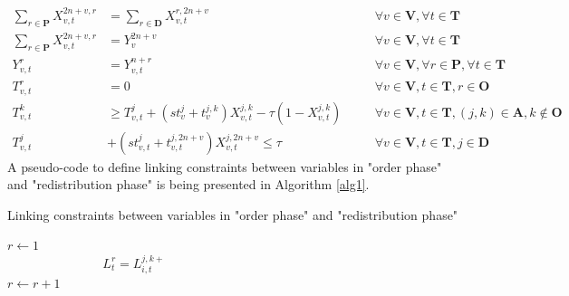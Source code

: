\documentclass[11pt,letter]{article}
\begin{document}
\begin{align}
\sum_{r \in \textbf{P}} X_{v,t}^{2n+v,r} & = \sum_{r \in \textbf{D}} X_{v,t}^{r,2n+v} && \quad \forall v \in \textbf{V}, \forall t \in \textbf{T} \\
\sum_{r \in \textbf{P}} X_{v,t}^{2n+v,r} & = Y_{v}^{2n+v} && \quad \forall v \in \textbf{V}, \forall t \in \textbf{T}\\
Y_{v,t}^{r} & = Y_{v,t}^{n+r} && \quad \forall v \in \textbf{V}, \forall r \in \textbf{P}, \forall t \in \textbf{T} \\
T_{v,t}^{r} & = 0 && \quad \forall v \in \textbf{V}, t \in \textbf{T}, r \in \textbf{O} \\
T_{v,t}^{k} & \geq T_{v,t}^{j}+(st_{v}^{j}+t_{v}^{j,k})X_{v,t}^{j,k}-\tau (1-X_{v,t}^{j,k}) && \quad \forall v \in \textbf{V}, t \in \textbf{T}, (j,k) \in \textbf{A}, k \not \in \textbf{O} \\
T_{v,t}^{j} & +(st_{v,t}^{j}+t_{v,t}^{j,2n+v})X_{v,t}^{j,2n+v} \leq \tau && \quad \forall v \in \textbf{V}, t \in \textbf{T}, j \in \textbf{D} 
\end{align}
A pseudo-code to define linking constraints between variables in "order phase" and "redistribution phase" is being presented in Algorithm \ref{alg1}.

\begin{algorithm}[H]
\caption{Linking constraints between variables in "order phase" and "redistribution phase"}
\label{alg1}
\begin{algorithmic}
\STATE $r \leftarrow 1$
 \STATE \begin{equation} L_{t}^{r} = L_{i,t}^{j,k{+}}  \qquad \qquad \qquad \qquad  \qquad \qquad \qquad \qquad \label{eq:link}
\end{equation} \STATE $r \leftarrow r+1$ 
\ENDIF
\ENDFOR
\ENDFOR
\ENDFOR
\end{algorithmic}
\end{algorithm} 
\end{document}
